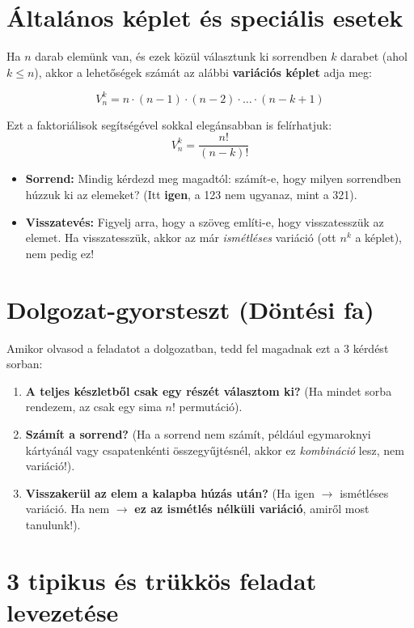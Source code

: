 \documentclass[11pt,a4paper]{article}
\begin{document}
\section{Általános képlet és speciális esetek}
Ha $n$ darab elemünk van, és ezek közül választunk ki sorrendben $k$ darabet (ahol $k \le n$), akkor a lehetőségek számát az alábbi \textbf{variációs képlet} adja meg:

\[ V_n^k = n \cdot (n-1) \cdot (n-2) \cdot \dots \cdot (n - k + 1) \]

Ezt a faktoriálisok segítségével sokkal elegánsabban is felírhatjuk:
\[ V_n^k = \frac{n!}{(n-k)!} \]

\begin{tcolorbox}[colback=myboxbg,colframe=myaccent,title=\textbf{Vigyázz a csapdákra!}]
\begin{itemize}
    \item \textbf{Sorrend:} Mindig kérdezd meg magadtól: számít-e, hogy milyen sorrendben húzzuk ki az elemeket? (Itt \textbf{igen}, a 123 nem ugyanaz, mint a 321).
    \item \textbf{Visszatevés:} Figyelj arra, hogy a szöveg említi-e, hogy visszatesszük az elemet. Ha visszatesszük, akkor az már \emph{ismétléses} variáció (ott $n^k$ a képlet), nem pedig ez!
\end{itemize}
\end{tcolorbox}

\section{Dolgozat-gyorsteszt (Döntési fa)}
Amikor olvasod a feladatot a dolgozatban, tedd fel magadnak ezt a 3 kérdést sorban:
\begin{enumerate}
    \item \textbf{A teljes készletből csak egy részét választom ki?} (Ha mindet sorba rendezem, az csak egy sima $n!$ permutáció).
    \item \textbf{Számít a sorrend?} (Ha a sorrend nem számít, például egymaroknyi kártyánál vagy csapatenkénti összegyűjtésnél, akkor ez \emph{kombináció} lesz, nem variáció!).
    \item \textbf{Visszakerül az elem a kalapba húzás után?} (Ha igen $\rightarrow$ ismétléses variáció. Ha nem $\rightarrow$ \textbf{ez az ismétlés nélküli variáció}, amiről most tanulunk!).
\end{enumerate}

\section{3 tipikus és trükkös feladat levezetése}
\end{document}
